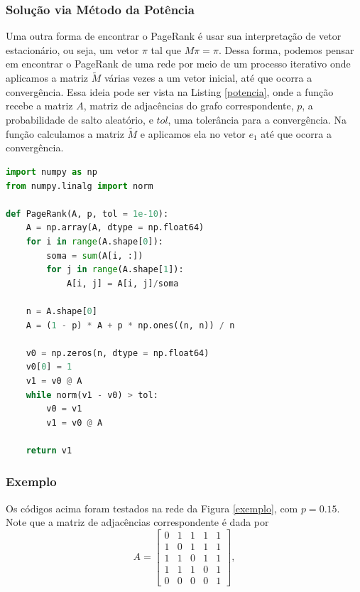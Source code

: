 \documentclass{article}
\begin{document}
\subsubsection*{Solução via Método da Potência}

Uma outra forma de encontrar o PageRank é usar sua interpretação de vetor estacionário, ou seja, um vetor $\pi$ tal que $M\pi = \pi$. Dessa forma, podemos pensar em encontrar o PageRank de uma rede por meio de um processo iterativo onde aplicamos a matriz $\tilde{M}$ várias vezes a um vetor inicial, até que ocorra a convergência. Essa ideia pode ser vista na Listing \ref{potencia}, onde a função recebe a matriz $A$, matriz de adjacências do grafo correspondente, $p$, a probabilidade de salto aleatório, e $tol$, uma tolerância para a convergência. Na função calculamos a matriz $\tilde{M}$ e aplicamos ela no vetor $e_1$ até que ocorra a convergência.

\begin{lstlisting}[language = Python, caption = Algoritmos para calcular a integral dada de modo aproximado., label = potencia]
import numpy as np
from numpy.linalg import norm

def PageRank(A, p, tol = 1e-10):
    A = np.array(A, dtype = np.float64)
    for i in range(A.shape[0]):
        soma = sum(A[i, :])
        for j in range(A.shape[1]):
            A[i, j] = A[i, j]/soma
            
    n = A.shape[0]
    A = (1 - p) * A + p * np.ones((n, n)) / n
    
    v0 = np.zeros(n, dtype = np.float64)
    v0[0] = 1
    v1 = v0 @ A
    while norm(v1 - v0) > tol:
        v0 = v1
        v1 = v0 @ A
        
    return v1
\end{lstlisting}

\subsubsection*{Exemplo}

Os códigos acima foram testados na rede da Figura \ref{exemplo}, com $p = 0.15$. Note que a matriz de adjacências correspondente é dada por
\[A = \begin{bmatrix}0 & 1 & 1 & 1 & 1 \\ 1 & 0 & 1 & 1 & 1 \\ 1 & 1 & 0 & 1 & 1 \\ 1 & 1 & 1 & 0 & 1 \\ 0 & 0 & 0 & 0 & 1\end{bmatrix},\]
\end{document}
